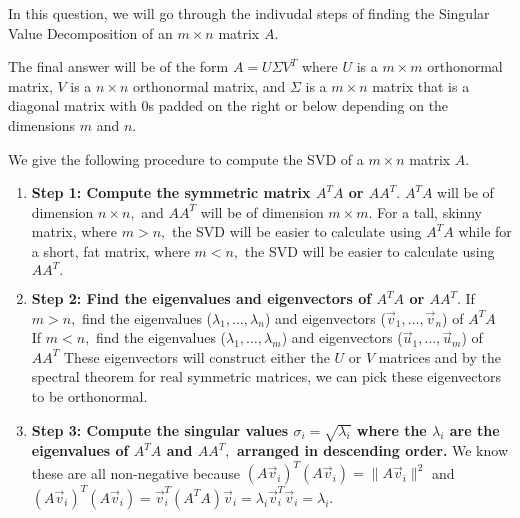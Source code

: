 

In this question, we will go through the indivudal steps of finding the Singular Value Decomposition of an $m \times n$ matrix $A.$

The final answer will be of the form $A = U \Sigma V^{T}$ where $U$ is a $m \times m$ orthonormal matrix, $V$ is a $n \times n$ orthonormal matrix, and $\Sigma$ is a $m \times n$ matrix that is a diagonal matrix with $0$s padded on the right or below depending on the dimensions $m$ and $n.$

We give the following procedure to compute the SVD of a $m \times n$ matrix $A.$

\begin{enumerate}[label=(\roman*)]
  \item \textbf{Step 1: Compute the symmetric matrix $A^{T} A$ or $A A^{T}.$} \vskip 1pt
  $A^{T}A$ will be of dimension $n \times n,$ and $AA^{T}$ will be of dimension $m \times m.$ \vskip 1pt
  For a tall, skinny matrix, where $m > n,$ the SVD will be easier to calculate using $A^{T}A$ while for a short, fat matrix, where $m < n,$ the SVD will be easier to calculate using $AA^{T}.$ 

  \item \textbf{Step 2: Find the eigenvalues and eigenvectors of $A^{T} A$ or $AA^{T}.$} \vskip 1pt
  If $m > n,$ find the eigenvalues ($\lambda_1, \ldots, \lambda_{n}$) and eigenvectors ($\vec{v}_1, \ldots, \vec{v}_{n}$) of $A^TA$ \\
  If $m < n,$ find the eigenvalues ($\lambda_1, \ldots, \lambda_{m}$) and eigenvectors ($\vec{u}_{1}, \ldots, \vec{u}_{m}$) of $AA^{T}$ \vskip 1pt
  These eigenvectors will construct either the $U$ or $V$ matrices and by the spectral theorem for real symmetric matrices, we can pick these eigenvectors to be orthonormal.

  \item \textbf{Step 3: Compute the singular values $\sigma_i = \sqrt{\lambda_i}$ where the $\lambda_i$ are the eigenvalues of $A^{T}A$ and $AA^{T},$ arranged in descending order.} \vskip 1pt 
  We know these are all non-negative because $(A\vec{v}_i)^T(A\vec{v}_i) = \|A \vec{v}_i\|^2$ and $(A\vec{v}_i)^T(A\vec{v}_i) =\vec{v}_i^T(A^T A)\vec{v}_i = \lambda_i \vec{v}_i^T\vec{v}_i = \lambda_i$. 


\end{enumerate}
